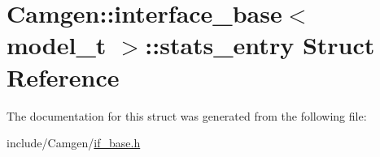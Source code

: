 \hypertarget{a00523}{}\section{Camgen\+:\+:interface\+\_\+base$<$ model\+\_\+t $>$\+:\+:stats\+\_\+entry Struct Reference}
\label{a00523}


The documentation for this struct was generated from the following file\+:\begin{DoxyCompactItemize}
\item 
include/\+Camgen/\hyperlink{a00666}{if\+\_\+base.\+h}\end{DoxyCompactItemize}
